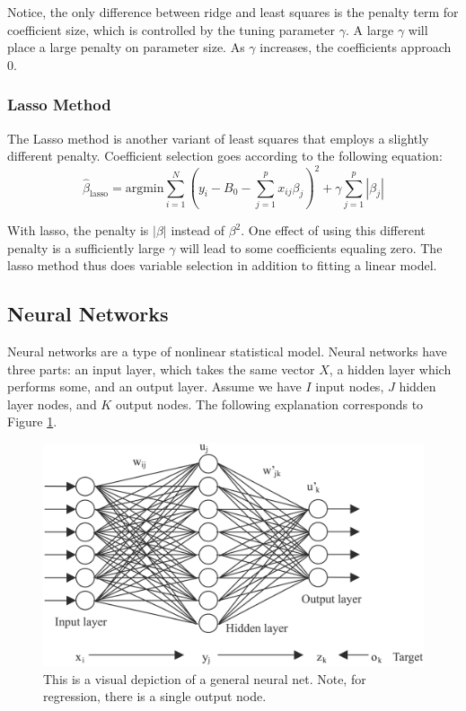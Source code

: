 \documentclass[12pt]{article}
\begin{document}
Notice, the only difference between ridge and least squares is the penalty term for coefficient size, which is controlled by the tuning parameter $\gamma$. A large $\gamma$ will place a large penalty on parameter size. As $\gamma$ increases, the coefficients approach 0. 

\subsubsection{Lasso Method}
The Lasso method is another variant of least squares that employs a slightly different penalty. Coefficient selection goes according to the following equation:
$$\hat{\beta}_{\text{lasso}} = \text{argmin} \sum_{i=1}^{N} (y_i - B_0 - \sum_{j=1}^{p} x_{ij} \beta_j)^2 + \gamma \sum_{j=1}^{p}|\beta_j|$$

With lasso, the penalty is $|\beta|$ instead of $\beta^2$. One effect of using this different penalty is a sufficiently large $\gamma$ will lead to some coefficients equaling zero. The lasso method thus does variable selection in addition to fitting a linear model. \cite[64]{springer}

\subsection{Neural Networks}
Neural networks are a type of nonlinear statistical model. Neural networks have three parts: an input layer, which takes the same vector $X$, a hidden layer which performs some, and an output layer. Assume we have $I$ input nodes, $J$ hidden layer nodes, and $K$ output nodes. The following explanation corresponds to Figure \ref{neuralnet}. 

\begin{figure}[ht]
	\centering
	\includegraphics[width=.85\textwidth]{NeuralNetwork.png}
	\caption{This is a visual depiction of a general neural net. Note, for regression, there is a single output node. \cite{neural}}
	\label{neuralnet}
\end{figure}
\end{document}
